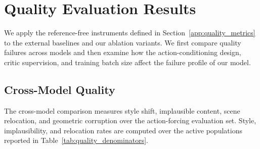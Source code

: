 \documentclass[letterpaper]{article} %
\begin{document}
%
%
\section{Quality Evaluation Results}
\label{app:quality_results}

We apply the reference-free instruments defined in
Section~\ref{app:quality_metrics} to the external baselines and our ablation
variants. We first compare quality failures across models and then examine how
the action-conditioning design, critic supervision, and training batch size
affect the failure profile of our model.


\subsection{Cross-Model Quality}
\label{app:cross_model_quality}

The cross-model comparison measures style shift, implausible content, scene
relocation, and geometric corruption over the action-forcing evaluation set.
Style, implausibility, and relocation rates are computed over the active
populations reported in Table~\ref{tab:quality_denominators}.

%
%
%
%
\end{document}
